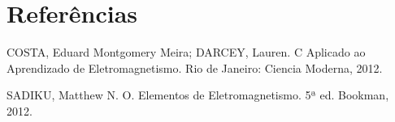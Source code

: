 \documentclass[12pt,a4paper]{article}
\begin{document}
\lipsum[1-1]

\newpage
\section{Referências}

\singlespacing COSTA, Eduard Montgomery Meira; DARCEY, Lauren. C Aplicado ao Aprendizado de
Eletromagnetismo. Rio de Janeiro: Ciencia Moderna, 2012.

\doublespacing 

\singlespacing \noindent SADIKU, Matthew N. O. Elementos de Eletromagnetismo. 5ª ed. Bookman, 2012.
\end{document}
